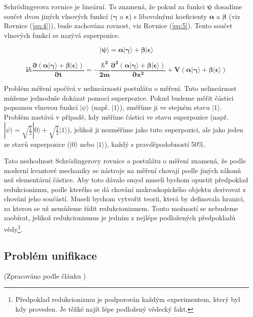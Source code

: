 Schrödingerova rovnice je lineární. To znamená, že pokud za funkci $\bm{\psi}$ dosadíme součet dvou jiných vlnových funkcí ($\bm{\gamma}$ a $\bm{\epsilon}$) s libovolnými koeficienty $\bm{\alpha}$ a $\bm{\beta}$ (viz Rovnice (\ref{eq:4})), bude zachována rovnost, viz Rovnice (\ref{eq:5}). Tento součet vlnových funkcí se nazývá superpozice.


\begin{equation}
    \bm{|\psi\rangle = \alpha|\gamma\rangle + \beta|\epsilon\rangle}
    \label{eq:4}
\end{equation}

\begin{equation}
    \bm{i\hbar \frac{\partial \bm{(\alpha|\gamma\rangle + \beta|\epsilon\rangle)}}{\partial t} = -\frac{\hbar^2}{2m}
    \frac{\partial^2 \bm{(\alpha|\gamma\rangle + \beta|\epsilon\rangle)}}{\partial x^2} + V \bm{(\alpha|\gamma\rangle + \beta|\epsilon\rangle)}}
    \label{eq:5}
\end{equation}

Problém měření spočívá v nelineárnosti postulátu o měření. Tuto nelineárnost může\-me jednoduše dokázat pomocí superpozice. Pokud budeme měřit částici popsanou vlnovou funkcí $|\psi\rangle$ (např. $|1\rangle$), změříme ji ve stejném stavu $|1\rangle$. Problém nastává v případě, kdy měříme částici ve stavu superpozice (např. $|\psi\rangle = \sqrt{\frac{1}{2}}|0\rangle + \sqrt{\frac{1}{2}}|1\rangle$), jelikož ji nezměříme jako tuto superpozici, ale jako jeden ze stavů superpozice ($|0\rangle$ nebo $|1\rangle$), každý s pravděpodobností 50\%.

Tato neshodnost Schrödingerovy rovnice a postulátu o měření znamená, že podle moderní kvantové mechaniky se nástroje na měření chovají podle jiných zákonů než elementární částice. Aby toto dávalo smysl museli bychom opustit předpoklad redukcionizmu, podle kterého se dá chování makroskopického objektu derivovat z chování jeho součástí. Museli bychom vytvořit teorii, která by definovala hranici, za kterou se už nemůžeme řídit redukcionizmem. Touto možností se nebudeme zaobírat, jelikož redukcionizmus je jedním z nejlépe podložených předpokladů vědy\footnote[1]{Předpoklad redukcionizmu je podporován každým experimentem, který byl kdy proveden. Je těžké najít lépe podložený vědecký fakt.}. 

\subsection{Problém unifikace} 
(Zpracováno podle článku \cite{unifprob})

